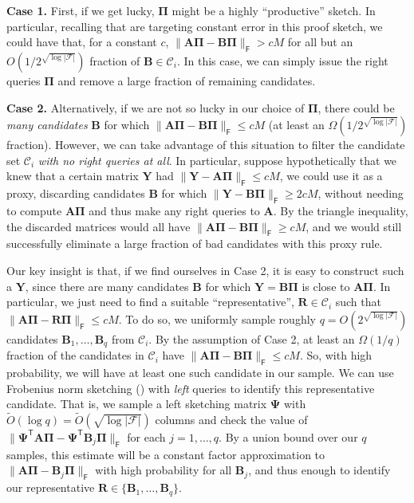\documentclass{article}[11pt]
\theoremstyle{definition}
\newcommand{\bv}[1]{\boldsymbol{\mathbf{#1}}}
\newcommand{\T}{\mathsf{T}}
\newcommand{\Fro}{\mathsf{F}}
\newcommand{\F}{\mathcal{F}}
\begin{document}
    \medskip
    \noindent\textbf{Case 1.}
    First, if we get lucky, $\bv \Pi$ might be a highly ``productive'' sketch. In particular, 
    recalling that are targeting constant error in this proof sketch, we could have that, for a constant $c$,
    $\|\bv{A}\bv{\Pi} - \bv{B}\bv{\Pi}\|_\Fro > c M$ for all but an $O(1/2^{\sqrt{\log|\F|}})$ fraction of $\bv{B}\in \mathcal{C}_i$. In this case, we can simply issue the right queries $\bv{\Pi}$ and remove a large fraction of remaining candidates.

    
    \medskip
    \noindent\textbf{Case 2.}
    Alternatively, if we are not so lucky in our choice of $\bv{\Pi}$, there could be \emph{many  candidates} $\bv{B}$ for which $\|\bv{A}\bv{\Pi}-\bv{B}\bv{\Pi}\|_\Fro \le c M$ (at least an $\Omega(1/2^{\sqrt{\log|\F|}})$ fraction).
    However, we can take advantage of this situation to filter the candidate set $\mathcal C_i$ \emph{with no right queries at all}.
    In particular, suppose hypothetically that we knew that a certain matrix $\bv{Y}$ had  $\|\bv Y-\bv{A}\bv{\Pi}\|_\Fro \le c  M$, we could use it as a proxy, discarding candidates $\bv{B}$ for which $\|\bv{Y} - \bv{B}\bv{\Pi}\|_\Fro \ge 2c M$, without needing to compute $\bv A \bv \Pi$ and thus make any right queries to $\bv A$.
    By the triangle inequality, the discarded matrices would all have $\|\bv{A \Pi} - \bv{B}\bv{\Pi}\|_\Fro \ge c M$, and we would still successfully eliminate a large fraction of bad candidates with this proxy rule.

    Our key insight is that, if we find ourselves in Case 2, it is easy to construct such a $\bv{Y}$, since there are many candidates $\bv{B}$ for which $\bv{Y} = \bv{B}\bv{\Pi}$ is close to $\bv{A}\bv{\Pi}$.
    In particular, we just need to find a suitable ``representative'', $\bv{R}\in \mathcal{C}_i$ such that $\|\bv{A}\bv{\Pi} - \bv{R}\bv{\Pi}\|_\Fro \le c  M$. 
    To do so, we uniformly sample roughly $q = O(2^{\sqrt{\log|\F|}})$ candidates $\bv{B}_1, \ldots, \bv{B}_q$ from $\mathcal C_i$. By the assumption of Case 2, at least an $\Omega (1/q)$ fraction of the candidates in $\mathcal C_i$ have $\|\bv{A}\bv{\Pi} - \bv{B}\bv{\Pi}\|_\Fro \leq c M$. So, with high probability, we will have at least one such candidate in our sample. %
    We can use Frobenius norm sketching () with \emph{left} queries to identify this representative candidate. That is, we sample a left sketching matrix $\bv{\Psi}$ with $\tilde O(\log q) = \tilde{O}(\sqrt{\log |\F|})$ columns and check the value of $\|\bv{\Psi}^\T\bv{A}\bv{\Pi} - \bv{\Psi}^\T\bv{B}_j\bv{\Pi}\|_\Fro$ for each $j = 1, \ldots, q$. By a union bound over our $q$ samples, this estimate will be a constant factor approximation to $\|\bv{A}\bv{\Pi} - \bv{B}_j\bv{\Pi}\|_\Fro$ with high probability for all $\bv B_j$, and thus enough to identify our representative $\bv R \in \{\bv B_1,\ldots,\bv B_q\}$.
          
\end{document}
